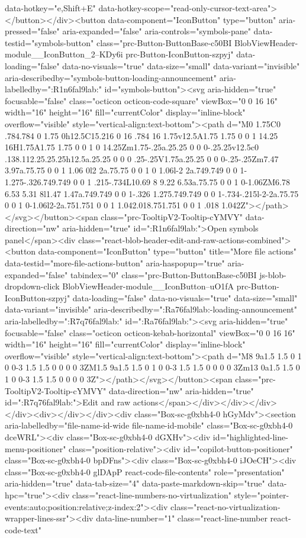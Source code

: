 {{{{{{{{{{{{{{{{{{{{{{{{{{{{{data-hotkey="e,Shift+E" data-hotkey-scope="read-only-cursor-text-area"></button></div><button data-component="IconButton" type="button" aria-pressed="false" aria-expanded="false" aria-controls="symbols-pane" data-testid="symbols-button" class="prc-Button-ButtonBase-c50BI BlobViewHeader-module__IconButton_2--KDy6i prc-Button-IconButton-szpyj" data-loading="false" data-no-visuals="true" data-size="small" data-variant="invisible" aria-describedby="symbols-button-loading-announcement" aria-labelledby=":R1n6fal9lab:" id="symbols-button"><svg aria-hidden="true" focusable="false" class="octicon octicon-code-square" viewBox="0 0 16 16" width="16" height="16" fill="currentColor" display="inline-block" overflow="visible" style="vertical-align:text-bottom"><path d="M0 1.75C0 .784.784 0 1.75 0h12.5C15.216 0 16 .784 16 1.75v12.5A1.75 1.75 0 0 1 14.25 16H1.75A1.75 1.75 0 0 1 0 14.25Zm1.75-.25a.25.25 0 0 0-.25.25v12.5c0 .138.112.25.25.25h12.5a.25.25 0 0 0 .25-.25V1.75a.25.25 0 0 0-.25-.25Zm7.47 3.97a.75.75 0 0 1 1.06 0l2 2a.75.75 0 0 1 0 1.06l-2 2a.749.749 0 0 1-1.275-.326.749.749 0 0 1 .215-.734L10.69 8 9.22 6.53a.75.75 0 0 1 0-1.06ZM6.78 6.53 5.31 8l1.47 1.47a.749.749 0 0 1-.326 1.275.749.749 0 0 1-.734-.215l-2-2a.75.75 0 0 1 0-1.06l2-2a.751.751 0 0 1 1.042.018.751.751 0 0 1 .018 1.042Z"></path></svg></button><span class="prc-TooltipV2-Tooltip-cYMVY" data-direction="nw" aria-hidden="true" id=":R1n6fal9lab:">Open symbols panel</span><div class="react-blob-header-edit-and-raw-actions-combined"><button data-component="IconButton" type="button" title="More file actions" data-testid="more-file-actions-button" aria-haspopup="true" aria-expanded="false" tabindex="0" class="prc-Button-ButtonBase-c50BI js-blob-dropdown-click BlobViewHeader-module__IconButton--uO1fA prc-Button-IconButton-szpyj" data-loading="false" data-no-visuals="true" data-size="small" data-variant="invisible" aria-describedby=":Ra76fal9lab:-loading-announcement" aria-labelledby=":R7q76fal9lab:" id=":Ra76fal9lab:"><svg aria-hidden="true" focusable="false" class="octicon octicon-kebab-horizontal" viewBox="0 0 16 16" width="16" height="16" fill="currentColor" display="inline-block" overflow="visible" style="vertical-align:text-bottom"><path d="M8 9a1.5 1.5 0 1 0 0-3 1.5 1.5 0 0 0 0 3ZM1.5 9a1.5 1.5 0 1 0 0-3 1.5 1.5 0 0 0 0 3Zm13 0a1.5 1.5 0 1 0 0-3 1.5 1.5 0 0 0 0 3Z"></path></svg></button><span class="prc-TooltipV2-Tooltip-cYMVY" data-direction="nw" aria-hidden="true" id=":R7q76fal9lab:">Edit and raw actions</span></div></div></div></div><div></div></div><div class="Box-sc-g0xbh4-0 hGyMdv"><section aria-labelledby="file-name-id-wide file-name-id-mobile" class="Box-sc-g0xbh4-0 dceWRL"><div class="Box-sc-g0xbh4-0 dGXHv"><div id="highlighted-line-menu-positioner" class="position-relative"><div id="copilot-button-positioner" class="Box-sc-g0xbh4-0 bpDFns"><div class="Box-sc-g0xbh4-0 iJOeCH"><div class="Box-sc-g0xbh4-0 glDApP react-code-file-contents" role="presentation" aria-hidden="true" data-tab-size="4" data-paste-markdown-skip="true" data-hpc="true"><div class="react-line-numbers-no-virtualization" style="pointer-events:auto;position:relative;z-index:2"><div class="react-no-virtualization-wrapper-lines-ssr"><div data-line-number="1" class="react-line-number react-code-text" }}}}}}}}}}}}}}}}}}}}}}}}}}}}}
